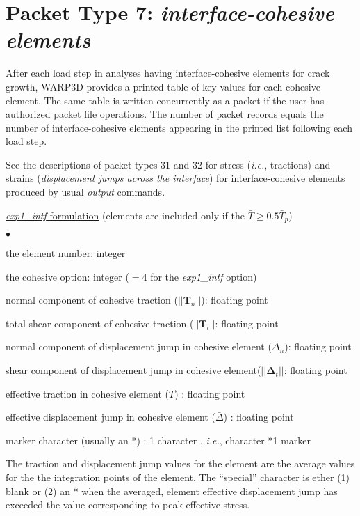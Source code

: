 \documentclass[10pt]{report}
\numberwithin{equation}{section}
\newcommand{\bmf } {\boldsymbol }
\newcommand{\ie}{\ti{i.e.},\xspace}
\newcommand{\ul} {\underline}
\newcommand{\ti}{\emph}
\newcommand{\squishlist}{
 \begin{list}{$\bullet$}
  { \setlength{\itemsep}{0pt}
     \setlength{\parsep}{3pt}
     \setlength{\topsep}{3pt}
     \setlength{\partopsep}{0pt}
     \setlength{\leftmargin}{1.5em}
     \setlength{\labelwidth}{1em}
     \setlength{\labelsep}{0.5em} } }
\newcommand{\squishend}{
  \end{list}  }
\begin{document}
\section{Packet Type 7: \ti{interface-cohesive elements }}
After each load step in analyses having interface-cohesive elements for crack 
growth, WARP3D provides a printed table of key values for each cohesive element. 
The same table is written concurrently as a packet if the user has authorized packet 
file operations. The number of packet records equals the number 
of interface-cohesive elements 
appearing in the printed list following each load step. 

See the descriptions of packet types 31 and 32 for stress (\ie tractions) 
and strains (\ti{displacement jumps across the interface}) for interface-cohesive
elements produced by usual \ti{output} commands.

\noindent \ul{\ti{exp1\_intf} formulation} (elements are included only if the
$\bar T \ge 0.5 \bar T_p$)
\squishlist
\item the element number:  integer
\item the cohesive option:  integer ($=4$ for the \ti{exp1\_intf} option)
\item normal component of cohesive traction ($||\bmf{T}_n||$):  floating point
\item total shear component of cohesive traction ($||\bmf{T}_t||$:  floating point
\item normal component of displacement jump in cohesive element ($\Delta_n$):  floating point
\item shear component of displacement jump in cohesive element($||\bmf{\Delta}_t||$:  floating point
\item effective traction in cohesive element ($\bar T$) :  floating point
\item effective displacement jump in cohesive element ($\bar \Delta$) :  floating point
\item marker character (usually an *) :  1 character , \ie character *1 marker
\squishend
\noindent The traction and displacement jump values for the element are the 
average values for the the integration points of the element. The ``special'' character 
is ether (1) blank or (2) an * when the averaged, element effective 
displacement jump has exceeded the value 
corresponding to peak effective stress. 
\end{document}

